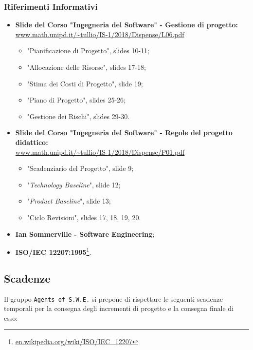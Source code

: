\subsubsection{Riferimenti Informativi}
\begin{itemize}
	\item \textbf{Slide del Corso "Ingegneria del Software" - Gestione di progetto:}\-\\ \url{www.math.unipd.it/~tullio/IS-1/2018/Dispense/L06.pdf}
	\begin{itemize}
		\item "Pianificazione di Progetto", slides 10-11; 
		\item "Allocazione delle Risorse", slides 17-18;
		\item "Stima dei Costi di Progetto", slide 19;
		\item "Piano di Progetto", slides 25-26;
		\item "Gestione dei Rischi", slides 29-30.
	\end{itemize}
	\item \textbf{Slide del Corso "Ingegneria del Software" - Regole del progetto didattico:}\-\\ \url{www.math.unipd.it/~tullio/IS-1/2018/Dispense/P01.pdf}
		\begin{itemize}
			\item "Scadenziario del Progetto", slide 9;
			\item "\textit{Technology Baseline}", slide 12;
			\item "\textit{Product Baseline}", slide 13;
			\item "Ciclo Revisioni", slides 17, 18, 19, 20. 
		\end{itemize}
	\item \textbf{Ian Sommerville - Software Engineering};
	\item \textbf{ISO/IEC 12207:1995}\footnote{\url{en.wikipedia.org/wiki/ISO/IEC_12207}}.
\end{itemize}




\newpage

\subsection{Scadenze}
Il gruppo \texttt{Agents of S.W.E.} si prepone di rispettare le seguenti scadenze temporali per la consegna degli incrementi di progetto e la consegna finale di esso:


